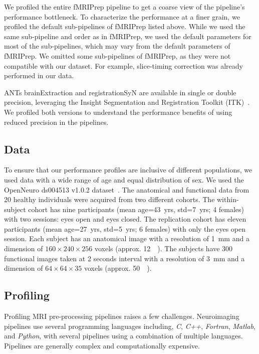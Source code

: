 \documentclass[conference]{IEEEtran}
\begin{document}
We profiled the entire fMRIPrep pipeline to get a coarse view of the pipeline's performance bottleneck. To characterize the performance at a finer grain, we profiled the default sub-pipelines of fMRIPrep listed above. While we used the same sub-pipeline and order as in fMRIPrep, we used the default parameters for most of the sub-pipelines, which may vary from the default parameters of fMRIPrep. We omitted some sub-pipelines of fMRIPrep, as they were not compatible with our dataset. For example, slice-timing correction was already performed in our data.

ANTs brainExtraction and registrationSyN are available in single or double precision, leveraging the Insight Segmentation and Registration Toolkit (ITK)~\cite{Yoo2002-ve}. We profiled both versions to understand the performance benefits of using reduced precision in the pipelines. 

\subsection{Data}
To ensure that our performance profiles are inclusive of different populations, we used data with a wide range of age and equal distribution of sex. We used the OpenNeuro ds004513 v1.0.2 dataset~\cite{ds004513:1.0.2}. The anatomical and functional data from 20 healthy individuals were acquired from two different cohorts. The within-subject cohort has nine participants (mean age=43~yrs, std=7~yrs; 4 females) with two sessions: eyes open and eyes closed. The replication cohort has eleven participants (mean age=27~yrs, std=5~yrs; 6 females) with only the eyes open session. Each subject has an anatomical image with a resolution of \SI{1}{\milli\meter} and a dimension of $160 \times 240 \times 256$ voxels (approx. \SI{12}{\mebi\byte}). The subjects have 300 functional images taken at 2 seconds interval with a resolution of \SI{3}{\milli\meter} and a dimension of $64 \times 64 \times 35$ voxels (approx. \SI{50}{\mebi\byte}).

\subsection{Profiling}
Profiling MRI pre-processing pipelines raises a few challenges. Neuroimaging pipelines use several programming languages including, \textit{C}, \textit{C++}, \textit{Fortran}, \textit{Matlab}, and \textit{Python}, with several pipelines using a combination of multiple languages. Pipelines are generally complex and computationally expensive.
\end{document}
